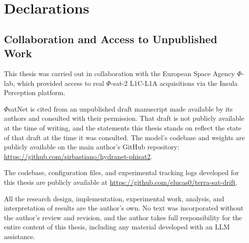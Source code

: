 \chapter*{Declarations}

\section*{Collaboration and Access to Unpublished Work}

This thesis was carried out in collaboration with the European Space Agency $\Phi$-lab, which provided access to real $\Phi$-sat-2 L1C-L1A acquisitions via the Insula Perception platform.

$\Phi$satNet is cited from an unpublished draft manuscript made available by its authors and consulted with their permission.
That draft is not publicly available at the time of writing, and the statements this thesis stands on reflect the state of that draft at the time it was consulted.
The model's codebase and weights are publicly available on the main author's GitHub repository: \url{https://github.com/sirbastiano/hydranet-phisat2}.

The codebase, configuration files, and experimental tracking logs developed for this thesis are publicly available at \url{https://github.com/elucas0/terra-sat-drift}.

All the research design, implementation, experimental work, analysis, and interpretation of results are the author's own.
No text was incorporated without the author's review and revision, and the author takes full responsibility for the entire content of this thesis, including any material developed with an LLM assistance.
